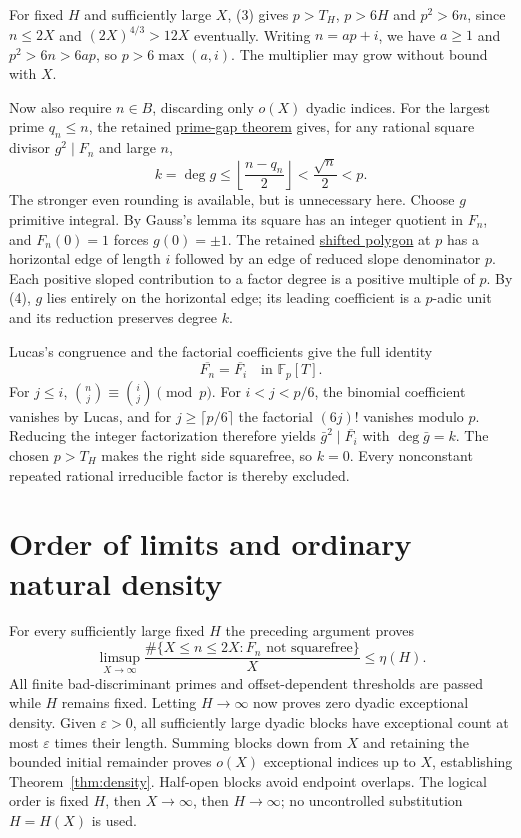 \documentclass[11pt]{article}
\newcommand{\F}{\mathbb F}
\begin{document}
For fixed $H$ and sufficiently large $X$, (3) gives $p>T_H$, $p>6H$
and $p^2>6n$, since $n\le2X$ and $(2X)^{4/3}>12X$ eventually.
Writing $n=ap+i$, we have $a\ge1$ and $p^2>6n>6ap$,
so $p>6\max(a,i)$. The multiplier may grow without bound with $X$.

Now also require $n\in B$, discarding only $o(X)$ dyadic indices.
For the largest prime $q_n\le n$, the retained
\href{PRIME_GAPS_AND_SMALL_KERNELS.tex}{prime-gap theorem} gives, for
any rational square divisor $g^2\mid F_n$ and large $n$,
\[
 k=\deg g\le\left\lfloor\frac{n-q_n}{2}\right\rfloor
 <\frac{\sqrt n}{2}<p. \tag{4}
\]
The stronger even rounding is available, but is unnecessary here.
Choose $g$ primitive integral. By Gauss's lemma its square has an integer
quotient in $F_n$, and $F_n(0)=1$ forces $g(0)=\pm1$.
The retained \href{SLOPE_COVERAGE_AND_SHIFTED_WINDOWS.tex}{shifted polygon}
at $p$ has a horizontal edge of length $i$ followed by an edge of
reduced slope denominator $p$. Each positive sloped contribution to a
factor degree is a positive multiple of $p$. By (4), $g$ lies entirely
on the horizontal edge; its leading coefficient is a $p$-adic unit and
its reduction preserves degree $k$.

Lucas's congruence and the factorial coefficients give the full identity
\[
 \overline{F_n}=\overline{F_i}\quad\text{in }\F_p[T]. \tag{5}
\]
For $j\le i$, $\binom nj\equiv\binom ij\pmod p$.
For $i<j<p/6$, the binomial coefficient vanishes by Lucas, and for
$j\ge\lceil p/6\rceil$ the factorial $(6j)!$ vanishes modulo $p$.
Reducing the integer factorization therefore yields
$\bar g^2\mid\overline{F_i}$ with $\deg\bar g=k$.
The chosen $p>T_H$ makes the right side squarefree, so $k=0$.
Every nonconstant repeated rational irreducible factor is thereby excluded.

\section{Order of limits and ordinary natural density}
For every sufficiently large fixed $H$ the preceding argument proves
\[
 \limsup_{X\to\infty}\frac{\#\{X\le n\le2X:F_n\text{ not squarefree}\}}{X}
 \le\eta(H).
\]
All finite bad-discriminant primes and offset-dependent thresholds are
passed while $H$ remains fixed. Letting $H\to\infty$ now proves zero
dyadic exceptional density. Given $\varepsilon>0$, all sufficiently large
dyadic blocks have exceptional count at most $\varepsilon$ times their
length. Summing blocks down from $X$ and retaining the bounded initial
remainder proves $o(X)$ exceptional indices up to $X$, establishing
Theorem~\ref{thm:density}. Half-open blocks avoid endpoint overlaps.
The logical order is fixed $H$, then $X\to\infty$, then $H\to\infty$;
no uncontrolled substitution $H=H(X)$ is used.
\end{document}
